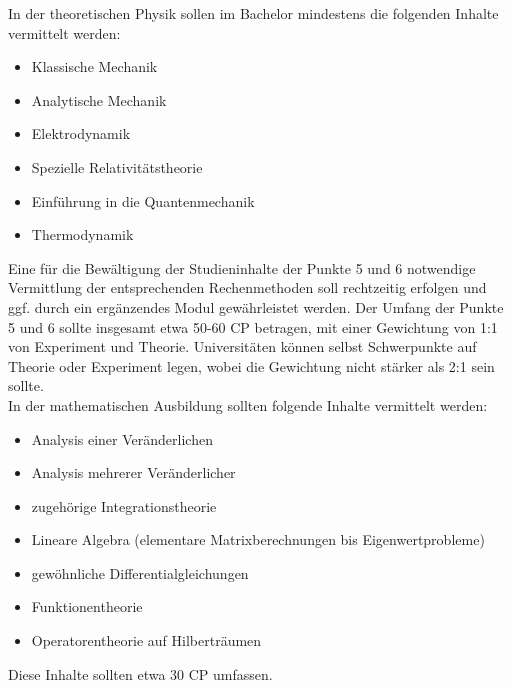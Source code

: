         In der theoretischen Physik sollen im Bachelor mindestens die folgenden Inhalte vermittelt werden:
        \begin{itemize}
          \item Klassische Mechanik
          \item Analytische Mechanik
          \item Elektrodynamik
          \item Spezielle Relativitätstheorie
          \item Einführung in die Quantenmechanik
          \item Thermodynamik
        \end{itemize}

        Eine für die Bewältigung der Studieninhalte der Punkte 5 und 6 notwendige Vermittlung der entsprechenden Rechenmethoden
        soll rechtzeitig erfolgen und ggf. durch ein ergänzendes Modul gewährleistet werden.
        Der Umfang der Punkte 5 und 6 sollte insgesamt etwa 50-60 CP betragen, mit einer Gewichtung von 1:1 von Experiment und Theorie.
        Universitäten können selbst Schwerpunkte auf Theorie oder Experiment legen, wobei die Gewichtung nicht stärker als 2:1 sein sollte. \\

        In der mathematischen Ausbildung sollten folgende Inhalte vermittelt werden:
            \begin{itemize}
              \item Analysis einer Veränderlichen
              \item Analysis mehrerer Veränderlicher
              \item zugehörige Integrationstheorie
              \item Lineare Algebra (elementare Matrixberechnungen bis Eigenwertprobleme)
              \item gewöhnliche Differentialgleichungen
              \item Funktionentheorie
              \item Operatorentheorie auf Hilberträumen
            \end{itemize}
        Diese Inhalte sollten etwa 30 CP umfassen. \\

